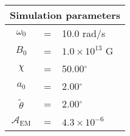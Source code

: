 \begin{tabular}{ccl}
\multicolumn{3}{c}{Simulation parameters} \\
\hline
$\omega_0$  &=& 10.0 rad/s\\
$B_0$  &=& ${1.0}{\times} 10^{13}$ G \\
$\chi$  &=& 50.00$^{\circ}$ \\
$a_0$ &=& 2.00$^{\circ}$ \\
$\tilde{\theta}$ &= & 2.00$^{\circ}$ \\
$\mathcal{A}_{\mathrm{EM}}$ &= & ${4.3}{\times} 10^{-6}$
\end{tabular}